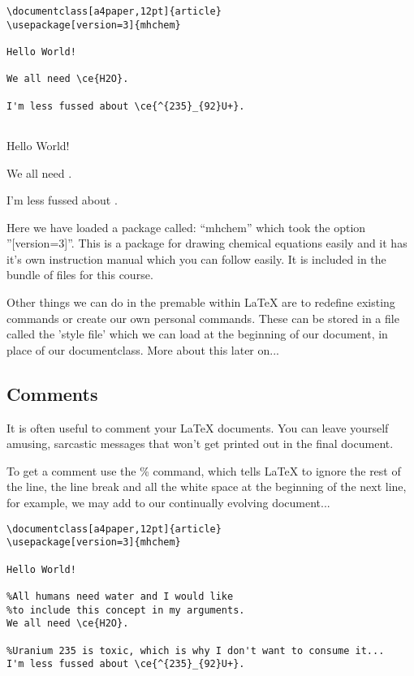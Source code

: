 \begin{verbatim}
\documentclass[a4paper,12pt]{article}
\usepackage[version=3]{mhchem}

Hello World!

We all need \ce{H2O}.

I'm less fussed about \ce{^{235}_{92}U+}.


\end{verbatim}

\vspace{2ex}

\pagebreak
Hello World!

We all need .

I'm less fussed about .
\pagebreak

Here we have loaded a package called: "`mhchem"' which took the option ''[version=3]''. This is a package for drawing chemical equations easily and it has it's own instruction manual which you can follow easily. It is included in the bundle of files for this course.

Other things we can do in the premable within LaTeX are to redefine existing commands or create our own personal commands. These can be stored in a file called the 'style file' which we can load at the beginning of our document, in place of our documentclass. More about this later on...


\subsection{Comments}
It is often useful to comment your LaTeX documents. You can leave yourself amusing, sarcastic messages that won't get printed out in the final document.

To get a comment use the \% command, which tells LaTeX to ignore the rest of the line, the line break and all the white space at the beginning of the next line, for example, we may add to our continually evolving document...

\begin{verbatim}
\documentclass[a4paper,12pt]{article}
\usepackage[version=3]{mhchem}

Hello World!

%All humans need water and I would like 
%to include this concept in my arguments.
We all need \ce{H2O}.

%Uranium 235 is toxic, which is why I don't want to consume it... 
I'm less fussed about \ce{^{235}_{92}U+}.


\end{verbatim}

